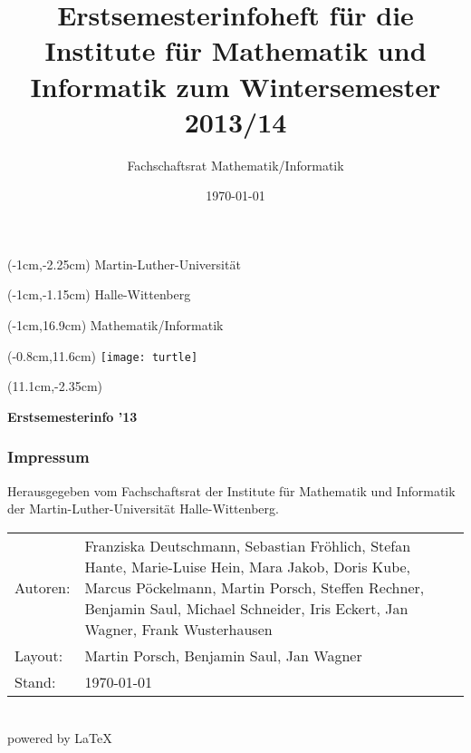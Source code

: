 
\thispagestyle{empty}
\title{Erstsemesterinfoheft für die Institute für Mathematik und Informatik zum
       Wintersemester 2013/14}
\author{Fachschaftsrat Mathematik/Informatik}
\date{\today}

\fontsize{1.05cm}{1cm}
\begin{textblock*}{\paperwidth}(-1cm,-2.25cm)
 \textsf{Martin-Luther-Universität}
\end{textblock*}
\begin{textblock*}{\paperwidth}(-1cm,-1.15cm)
 \textsf{Halle-Wittenberg}
\end{textblock*}
\begin{textblock*}{\paperwidth}(-1cm,16.9cm)
 \textsf{Mathematik/Informatik}
\end{textblock*}
\begin{textblock*}{\paperwidth}(-0.8cm,11.6cm)
 \texttt{[image: turtle]}
\end{textblock*}
\fontsize{2.06cm}{1cm}
\begin{textblock*}{\paperwidth}(11.1cm,-2.35cm)
 \begin{sideways}
  \textsf{\textbf{Erstsemesterinfo ’13}}
 \end{sideways}
\end{textblock*}
\normalsize

\newpage
\thispagestyle{empty}
\subsubsection{Impressum}
Herausgegeben vom Fachschaftsrat der Institute für Mathematik und Informatik der
Martin-Luther-Universität Halle-Wittenberg.\\[1.0em]
\begin{tabularx}{\textwidth}{@{}lX}
 Autoren: & Franziska Deutschmann,                                              %
            Sebastian Fröhlich,
            Stefan Hante,
            Marie-Luise Hein,
            Mara Jakob,
            Doris Kube,
            Marcus Pöckelmann,
            Martin Porsch,
            Steffen Rechner,
            Benjamin Saul,
            Michael Schneider,
            Iris Eckert,
            Jan Wagner,
            Frank Wusterhausen\\
 Layout:  & Martin Porsch, Benjamin Saul, Jan Wagner\\
 Stand:   & \today\\
\end{tabularx}\\[1.0em]
powered by \LaTeX
\pagebreak

